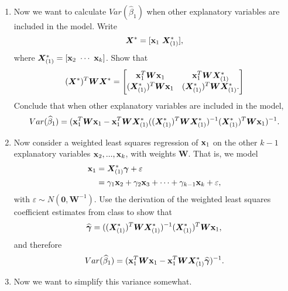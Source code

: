\documentclass[11pt]{article}
\begin{document}
\begin{enumerate}
\begin{enumerate}
\item Now we want to calculate $Var(\widehat{\beta}_1)$ when other explanatory variables are included in the model. Write 
$$\bm{X}^* = [{\bf x}_1 \ \bm{X}^*_{(1)}],$$ 
where $\bm{X}^*_{(1)} = [{\bf x}_2 \ \cdots \ {\bf x}_k]$. Show that 
$$(\bm{X}^*)^T \bm{W} \bm{X}^* =
\begin{bmatrix}
{\bf x}_1^T \bm{W} {\bf x}_1 & {\bf x}_1^T \bm{W} \bm{X}^*_{(1)} \\
(\bm{X}^*_{(1)})^T \bm{W} {\bf x}_1 & (\bm{X}^*_{(1)})^T \bm{W} \bm{X}^*_{(1)}.
\end{bmatrix}
$$
Conclude that when other explanatory variables are included in the model,
$$Var(\widehat{\beta}_1) = ({\bf x}_1^T \bm{W} {\bf x}_1 - {\bf x}_1^T \bm{W} \bm{X}^*_{(1)} ((\bm{X}^*_{(1)})^T \bm{W} \bm{X}^*_{(1)})^{-1} (\bm{X}^*_{(1)})^T \bm{W} {\bf x}_1)^{-1}.$$

\item Now consider a weighted least squares regression of ${\bf x}_1$ on the other $k-1$ explanatory variables ${\bf x}_2,...,{\bf x}_k$, with weights $\bm{W}$. That is, we model
\begin{align*}
{\bf x}_1 &= \bm{X}^*_{(1)} \bm{\gamma} + \varepsilon \\ 
&= \gamma_1 {\bf x}_2 + \gamma_2 {\bf x}_3 + \cdots + \gamma_{k-1} {\bf x}_k + \varepsilon,
\end{align*}
with $\varepsilon \sim N(\bm{0}, \bm{W}^{-1})$. Use the derivation of the weighted least squares coefficient estimates from class to show that
$$\widehat{\bm{\gamma}} = ((\bm{X}^*_{(1)})^T \bm{W} \bm{X}^*_{(1)})^{-1} (\bm{X}^*_{(1)})^T \bm{W} {\bf x}_1,$$
and therefore
$$Var(\widehat{\beta}_1) = ({\bf x}_1^T \bm{W} {\bf x}_1 - {\bf x}_1^T \bm{W} \bm{X}^*_{(1)} \widehat{\bm{\gamma}})^{-1}.$$

\item Now we want to simplify this variance somewhat.
\end{enumerate}
\end{enumerate}
\end{document}
